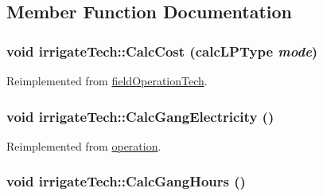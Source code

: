 \subsection{Member Function Documentation}
\hypertarget{classirrigate_tech_a68212d5382845e1cf877f0c2b1ab1019}{
\subsubsection[{CalcCost}]{\setlength{\rightskip}{0pt plus 5cm}void irrigateTech::CalcCost ({\bf calcLPType} {\em mode})}}
\label{classirrigate_tech_a68212d5382845e1cf877f0c2b1ab1019}


Reimplemented from \hyperlink{classfield_operation_tech_a908e81a53479de1a6768d58964dbc57c}{fieldOperationTech}.\hypertarget{classirrigate_tech_aff9f1aa84dc7255d893012191ac232f4}{
\subsubsection[{CalcGangElectricity}]{\setlength{\rightskip}{0pt plus 5cm}void irrigateTech::CalcGangElectricity ()}}
\label{classirrigate_tech_aff9f1aa84dc7255d893012191ac232f4}


Reimplemented from \hyperlink{classoperation_a056348509e5e2da6c1cc03360a587df8}{operation}.\hypertarget{classirrigate_tech_a936cb4d45c7ae68deaa04ce5d9397dbe}{
\subsubsection[{CalcGangHours}]{\setlength{\rightskip}{0pt plus 5cm}void irrigateTech::CalcGangHours ()}}
\label{classirrigate_tech_a936cb4d45c7ae68deaa04ce5d9397dbe}


